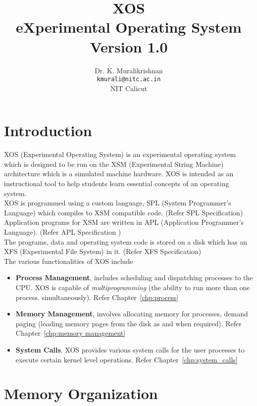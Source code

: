 \documentclass[10pt]{report}
\title{XOS \\ eXperimental Operating System \\
Version 1.0}
\author{Dr. K. Muralikrishnan  \\ \texttt{kmurali@nitc.ac.in} \\ {NIT Calicut} }
\begin{document}
\maketitle
\pagebreak

\thispagestyle{plain}

\tableofcontents
\pagebreak

\chapter{Introduction}
\label{chp:osintro}

XOS (Experimental Operating System) is an experimental operating system  which is designed to be run on the  XSM  (Experimental String Machine) architecture which is a simulated machine hardware. XOS is intended as an instructional tool to help students learn essential concepts of an operating system. 
\vspace{0.1in} \\
XOS is programmed using a custom language, SPL (System Programmer's Language) which compiles to XSM compatible code. (Refer SPL Specification) Application programs for XSM are written in APL (Application Programmer's Language). (Refer APL Specification ) 
\vspace{0.1in} \\
The programs, data and operating system code is stored on a disk which has an XFS (Experimental File System) in it. (Refer XFS Specification)\\

The various functionalities of XOS include
\begin{itemize}
\item \textbf{Process Management}, includes scheduling and dispatching processes to the CPU. XOS is capable of \textit{multiprogramming} (the ability to run more than one process.  simultaneously). Refer Chapter~\ref{chp:process}
\item \textbf{Memory Management}, involves allocating memory for processes, demand paging (loading memory pages from the disk as and when required). Refer Chapter~\ref{chp:memory management}
\item \textbf{System Calls}. XOS provides various system calls for the user processes to execute certain kernel level operations. Refer Chapter~\ref{chp:system_calls}
\end{itemize} 


\chapter{Memory Organization}
\label{chp:memoryorg}
\end{document}
